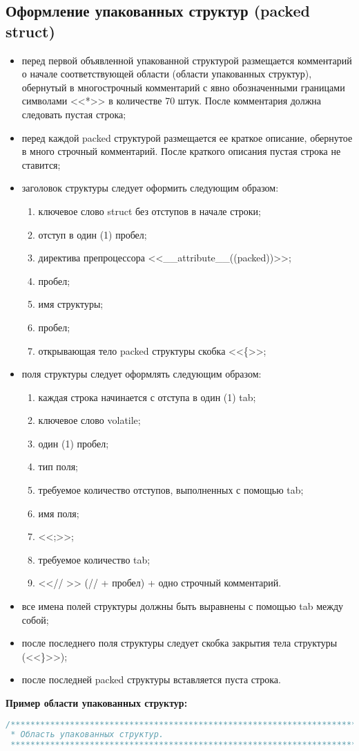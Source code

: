 \subsection{Оформление упакованных структур (packed struct)}
\begin{itemize}
	\item перед первой объявленной упакованной структурой размещается комментарий о начале соответствующей области (области упакованных структур), обернутый в многострочный комментарий с явно обозначенными границами символами <<*>> в количестве 70 штук. После комментария должна следовать  пустая строка;
	\item перед каждой packed структурой размещается ее краткое описание, обернутое в много строчный комментарий. После краткого описания пустая строка не ставится;
	\item заголовок структуры следует оформить следующим образом:
	\begin{enumerate}
		\item ключевое слово struct без отступов в начале строки;
		\item отступ в один (1) пробел;
		\item директива препроцессора <<\_\_attribute\_\_((packed))>>;
		\item пробел;
		\item имя структуры;
		\item пробел;
		\item открывающая тело packed структуры скобка <<\{>>;
	\end{enumerate}
	\item поля структуры следует оформлять следующим образом:
	\begin{enumerate}
		\item каждая строка начинается с отступа в один (1) tab;
		\item ключевое слово volatile;
		\item один (1) пробел;
		\item тип поля;
		\item требуемое количество отступов, выполненных с помощью tab;
		\item имя поля;
		\item <<;>>;
		\item требуемое количество tab;
		\item <<// >> (// + пробел) + одно строчный комментарий.
	\end{enumerate}
	\item все имена полей структуры должны быть выравнены с помощью tab между собой;
	\item после последнего поля структуры следует скобка закрытия тела структуры (<<\}>>);
	\item после последней packed структуры вставляется пуста строка.
\end{itemize}\textbf{Пример области упакованных структур:}\begin{lstlisting}[language=C++, frame=tlBR, basicstyle=\fontsize{10}{10}\ttfamily]
/**********************************************************************
 * Область упакованных структур.
 **********************************************************************/


\end{lstlisting}
